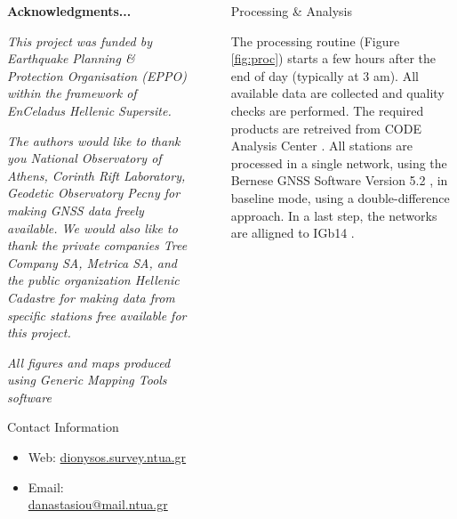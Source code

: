 \documentclass[final,a0,portrait]{beamer}
\newlength{\sepwid}
\newlength{\onecolwid}
\begin{document}
\begin{frame}[t]
\begin{columns}[t]
\begin{column}{\onecolwid}
\textbf{Acknowledgments...}
\par\textit{\footnotesize This project was funded by Earthquake Planning \& Protection Organisation (EPPO) within the framework of EnCeladus Hellenic Supersite. }
\par\textit{\footnotesize The authors would like to thank you National Observatory of Athens, Corinth Rift Laboratory, Geodetic Observatory Pecny for making GNSS data freely available. We would also like to thank the private companies Tree Company SA, Metrica SA, and the public organization Hellenic Cadastre for making data from specific stations free available for this project.}
\par\textit{\footnotesize All figures and maps produced using Generic Mapping Tools software \cite{gmt}}

\begin{alertblock}{Contact Information}
\begin{itemize}
\item Web: \href{http://dionysos.survey.ntua.gr}{dionysos.survey.ntua.gr}
\item Email: \href{danastasiout@mail.ntua.gr}{danastasiou@mail.ntua.gr}
\end{itemize}
\end{alertblock}




\end{column} %


\begin{column}{\sepwid}\end{column} %

\begin{column}{\onecolwid} %


\begin{block}{Processing \& Analysis}

{\small
The processing routine (Figure \ref{fig:proc}) starts a few hours after the end of day (typically at 3 am). All available data are collected and quality 
checks are performed. The required products are retreived from CODE Analysis Center \cite{codeac}.
All stations are processed in a single network, using the Bernese GNSS Software Version 5.2 \cite{bernese}, in baseline mode, 
using a double-difference approach. In a last step, the networks are alligned to IGb14 \cite{igb14}.

}
\end{block}
\end{column}
\end{columns}
\end{frame}
\end{document}
